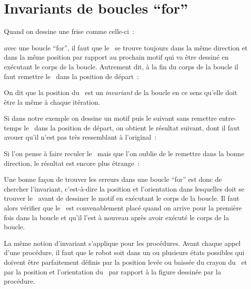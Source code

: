 

\section{Invariants de boucles ``for''}

Quand on dessine une frise comme celle-ci~:\\[9mm]
%
\vspace*{-9mm}%

\noindent avec une boucle ``for'', il faut que le \robot\ se trouve toujours dans
la même direction
et dans la même position par rapport au prochain motif qui va être
dessiné en exécutant
le corps de la boucle. Autrement dit, à la fin du corps de la
boucle il faut
remettre le \robot\ dans la position de départ~:

On dit que la position du \robot\ est un {\em invariant} de la boucle en ce sens
qu'elle doit être la même à chaque itération.

Si dans notre exemple on dessine un motif puis le suivant sans remettre entre-temps
le \robot\ dans la position de départ, on obtient le résultat suivant, dont
il faut avouer qu'il n'est pas très ressemblant à l'original~:\\[5cm]
%
\vspace*{-5cm}


Si l'on pense à faire reculer le \robot\ mais que l'on oublie de le remettre
dans la bonne direction, le résultat est encore plus étrange~:\\[25mm]
%
\vspace*{-25mm}


Une bonne façon de trouver les erreurs dans une boucle ``for'' est donc
de chercher l'invariant, c'est-à-dire la position et l'orientation dans
lesquelles doit se trouver le \robot\ avant de dessiner le motif en
exécutant le corps de la boucle. Il faut alors vérifier que le \robot\ est
convenablement placé quand on arrive pour la première fois dans la boucle
et qu'il l'est à nouveau après avoir exécuté le corps de la boucle.

La même notion d'invariant s'applique pour les procédures. Avant chaque
appel d'une procédure, il faut que le robot soit dans un ou plusieurs
états possibles qui doivent être parfaitement définis par la position
levée ou baissée du crayon du \robot\ et par la position et l'orientation
du \robot\ par rapport à la figure dessinée par la procédure.

